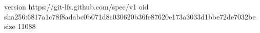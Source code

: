 version https://git-lfs.github.com/spec/v1
oid sha256:6817a1c78f8adabc0b071d8c030620b36fe87620e173a3033d1bbe72de7032be
size 11088
